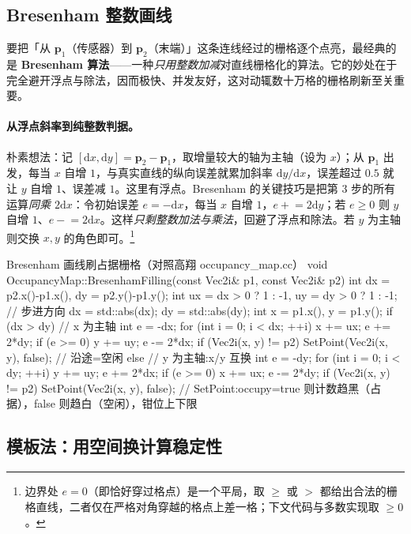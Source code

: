 \subsection{Bresenham 整数画线}
\label{sec:slam2d-bresenham}

要把「从 $\mathbf{p}_1$（传感器）到 $\mathbf{p}_2$（末端）」这条连线经过的栅格逐个点亮，最经典的是 \textbf{Bresenham 算法}——一种\emph{只用整数加减}对直线栅格化的算法。它的妙处在于完全避开浮点与除法，因而极快、并发友好，这对动辄数十万格的栅格刷新至关重要。

\paragraph{从浮点斜率到纯整数判据。}
朴素想法：记 $[\mathrm{d}x,\mathrm{d}y]=\mathbf{p}_2-\mathbf{p}_1$，取增量较大的轴为主轴（设为 $x$）；从 $\mathbf{p}_1$ 出发，每当 $x$ 自增 $1$，与真实直线的纵向误差就累加斜率 $\mathrm{d}y/\mathrm{d}x$，误差超过 $0.5$ 就让 $y$ 自增 $1$、误差减 $1$。这里有浮点。Bresenham 的关键技巧是把第 $3$ 步的所有运算\emph{同乘 $2\mathrm{d}x$}：令初始误差 $e=-\mathrm{d}x$，每当 $x$ 自增 $1$，$e\mathrel{+}=2\mathrm{d}y$；若 $e\ge 0$ 则 $y$ 自增 $1$、$e\mathrel{-}=2\mathrm{d}x$。这样\emph{只剩整数加法与乘法}，回避了浮点和除法。若 $y$ 为主轴则交换 $x,y$ 的角色即可。\footnote{边界处 $e=0$（即恰好穿过格点）是一个平局，取 $\ge$ 或 $>$ 都给出合法的栅格直线，二者仅在严格对角穿越的格点上差一格；下文代码与多数实现取 $\ge 0$。}

\begin{codebox}[C++]{Bresenham 画线刷占据栅格（对照高翔 occupancy\_map.cc）}
void OccupancyMap::BresenhamFilling(const Vec2i& p1, const Vec2i& p2) {
  int dx = p2.x()-p1.x(), dy = p2.y()-p1.y();
  int ux = dx > 0 ? 1 : -1,  uy = dy > 0 ? 1 : -1;     // 步进方向
  dx = std::abs(dx); dy = std::abs(dy);
  int x = p1.x(), y = p1.y();
  if (dx > dy) {                                        // x 为主轴
    int e = -dx;
    for (int i = 0; i < dx; ++i) {
      x += ux;  e += 2*dy;
      if (e >= 0) { y += uy; e -= 2*dx; }
      if (Vec2i(x, y) != p2) SetPoint(Vec2i(x, y), false); // 沿途=空闲
    }
  } else {                                              // y 为主轴:x/y 互换
    int e = -dy;
    for (int i = 0; i < dy; ++i) {
      y += uy;  e += 2*dx;
      if (e >= 0) { x += ux; e -= 2*dy; }
      if (Vec2i(x, y) != p2) SetPoint(Vec2i(x, y), false);
    }
  }
}
// SetPoint:occupy=true 则计数趋黑（占据），false 则趋白（空闲），钳位上下限
\end{codebox}

\subsection{模板法：用空间换计算稳定性}
\label{sec:slam2d-template}

